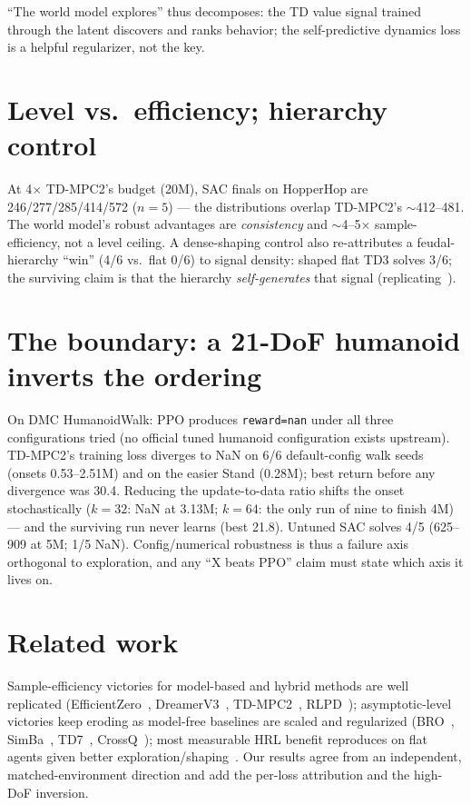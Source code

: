 \documentclass[10pt]{article}
\begin{document}
``The world model explores'' thus decomposes: the TD value signal trained through the latent discovers and
ranks behavior; the self-predictive dynamics loss is a helpful regularizer, not the key.

\section{Level vs.\ efficiency; hierarchy control}\label{sec:level}
At 4$\times$ TD-MPC2's budget (20M), SAC finals on HopperHop are 246/277/285/414/572 ($n{=}5$) --- the
distributions overlap TD-MPC2's ${\sim}$412--481. The world model's robust advantages are \emph{consistency}
and ${\sim}$4--5$\times$ sample-efficiency, not a level ceiling. A dense-shaping control also re-attributes a
feudal-hierarchy ``win'' (4/6 vs.\ flat 0/6) to signal density: shaped flat TD3 solves 3/6; the surviving
claim is that the hierarchy \emph{self-generates} that signal (replicating~\citealp{nachum2019hrl}).

\section{The boundary: a 21-DoF humanoid inverts the ordering}\label{sec:boundary}
On DMC HumanoidWalk: PPO produces \texttt{reward=nan} under all three configurations tried (no official tuned
humanoid configuration exists upstream). TD-MPC2's training loss diverges to NaN on 6/6 default-config walk
seeds (onsets 0.53--2.51M) and on the easier Stand (0.28M); best return before any divergence was 30.4.
Reducing the update-to-data ratio shifts the onset stochastically ($k{=}32$: NaN at 3.13M; $k{=}64$: the only
run of nine to finish 4M) --- and the surviving run never learns (best 21.8). Untuned SAC solves 4/5
(625--909 at 5M; 1/5 NaN). Config/numerical robustness is thus a failure axis orthogonal to exploration, and
any ``X beats PPO'' claim must state which axis it lives on.

\section{Related work}\label{sec:related}
Sample-efficiency victories for model-based and hybrid methods are well replicated
(EfficientZero~\citep{ye2021efficientzero}, DreamerV3~\citep{hafner2023dreamerv3},
TD-MPC2~\citep{hansen2024tdmpc2}, RLPD~\citep{ball2023rlpd}); asymptotic-level victories keep eroding as
model-free baselines are scaled and regularized (BRO~\citep{nauman2024bro}, SimBa~\citep{lee2024simba},
TD7~\citep{fujimoto2023td7}, CrossQ~\citep{bhatt2024crossq}); most measurable HRL benefit reproduces on flat
agents given better exploration/shaping~\citep{nachum2019hrl}. Our results agree from an independent,
matched-environment direction and add the per-loss attribution and the high-DoF inversion.
\end{document}
